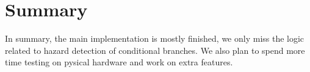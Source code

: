 \section{Summary}
In summary, the main implementation is mostly finished, we only miss the logic related to 
hazard detection of conditional branches. We also plan to spend more time testing on
pysical hardware and work on extra features.
